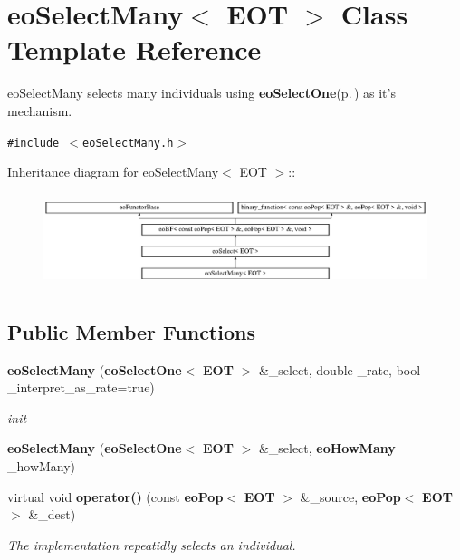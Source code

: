 \section{eo\-Select\-Many$<$ EOT $>$ Class Template Reference}
\label{classeo_select_many}
eo\-Select\-Many selects many individuals using {\bf eo\-Select\-One}{\rm (p.\,\pageref{classeo_select_one})} as it's mechanism.  


{\tt \#include $<$eo\-Select\-Many.h$>$}

Inheritance diagram for eo\-Select\-Many$<$ EOT $>$::\begin{figure}[H]
\begin{center}
\leavevmode
\includegraphics[height=2.75184cm]{classeo_select_many}
\end{center}
\end{figure}
\subsection*{Public Member Functions}
\begin{CompactItemize}
\item 
{\bf eo\-Select\-Many} ({\bf eo\-Select\-One}$<$ {\bf EOT} $>$ \&\_\-select, double \_\-rate, bool \_\-interpret\_\-as\_\-rate=true)\label{classeo_select_many_a0}

\begin{CompactList}\small\item\em init \item\end{CompactList}\item 
{\bf eo\-Select\-Many} ({\bf eo\-Select\-One}$<$ {\bf EOT} $>$ \&\_\-select, {\bf eo\-How\-Many} \_\-how\-Many)\label{classeo_select_many_a1}

\item 
virtual void {\bf operator()} (const {\bf eo\-Pop}$<$ {\bf EOT} $>$ \&\_\-source, {\bf eo\-Pop}$<$ {\bf EOT} $>$ \&\_\-dest)
\begin{CompactList}\small\item\em The implementation repeatidly selects an individual. \item\end{CompactList}\end{CompactItemize}
